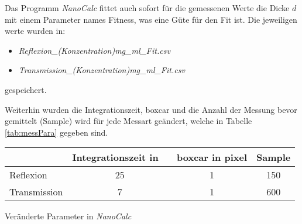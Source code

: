 Das Programm \textit{NanoCalc} fittet auch sofort für die gemessenen Werte die Dicke $d$ mit einem Parameter names Fitness, was eine Güte für den Fit ist. Die jeweiligen werte wurden in:
\begin{itemize}
	\item \textit{Reflexion\_(Konzentration)mg\_ml\_Fit.csv}
	\item \textit{Transmission\_(Konzentration)mg\_ml\_Fit.csv}
\end{itemize}
gespeichert. \bigskip

Weiterhin wurden die Integrationszeit, boxcar und die Anzahl der Messung bevor gemittelt (Sample) wird für jede Messart geändert, welche in Tabelle \ref{tab:messPara} gegeben sind.
\begin{center}
	\captionsetup{type=table}
	\begin{tabular}{l | c c c}
		             & Integrationszeit in \si{\milli\sec} & boxcar in pixel & Sample \\
		\hline
		Reflexion    & 25								   & 1				 & 150    \\
		Transmission & 7								   & 1 				 & 600    
	\end{tabular}
	\caption{Veränderte Parameter in \textit{NanoCalc}}
	\label{tab:messPara}
\end{center} 